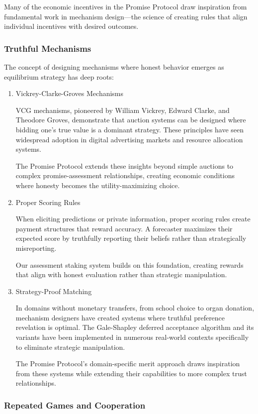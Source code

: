 \documentclass[11pt]{article}
\begin{document}
Many of the economic incentives in the Promise Protocol draw inspiration from fundamental work in mechanism design—the science of creating rules that align individual incentives with desired outcomes.
\subsubsection{Truthful Mechanisms}
\label{sec:org6491929}

The concept of designing mechanisms where honest behavior emerges as equilibrium strategy has deep roots:
\begin{enumerate}
\item Vickrey-Clarke-Groves Mechanisms
\label{sec:org1020743}

VCG mechanisms, pioneered by William Vickrey, Edward Clarke, and Theodore Groves, demonstrate that auction systems can be designed where bidding one's true value is a dominant strategy. These principles have seen widespread adoption in digital advertising markets and resource allocation systems.

The Promise Protocol extends these insights beyond simple auctions to complex promise-assessment relationships, creating economic conditions where honesty becomes the utility-maximizing choice.
\item Proper Scoring Rules
\label{sec:org4d4036c}

When eliciting predictions or private information, proper scoring rules create payment structures that reward accuracy. A forecaster maximizes their expected score by truthfully reporting their beliefs rather than strategically misreporting.

Our assessment staking system builds on this foundation, creating rewards that align with honest evaluation rather than strategic manipulation.
\item Strategy-Proof Matching
\label{sec:orga1017f6}

In domains without monetary transfers, from school choice to organ donation, mechanism designers have created systems where truthful preference revelation is optimal. The Gale-Shapley deferred acceptance algorithm and its variants have been implemented in numerous real-world contexts specifically to eliminate strategic manipulation.

The Promise Protocol's domain-specific merit approach draws inspiration from these systems while extending their capabilities to more complex trust relationships.
\end{enumerate}
\subsubsection{Repeated Games and Cooperation}
\label{sec:org6b9fc5a}
\end{document}
